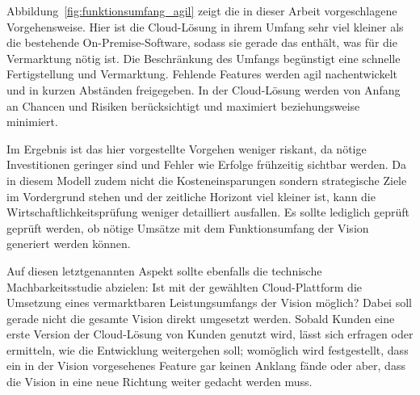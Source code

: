 
Abbildung~\ref{fig:funktionsumfang_agil} zeigt die in dieser Arbeit 
vorgeschlagene Vorgehensweise. Hier ist die Cloud-Lösung in ihrem Umfang sehr 
viel kleiner als die bestehende On-Premise-Software, sodass sie gerade das 
enthält, was für die Vermarktung nötig ist. Die Beschränkung des Umfangs 
begünstigt eine schnelle Fertigstellung und Vermarktung. Fehlende Features 
werden agil nachentwickelt und in kurzen Abständen freigegeben. In der 
Cloud-Lösung werden von Anfang an Chancen und Risiken berücksichtigt und 
maximiert beziehungsweise minimiert. 

Im Ergebnis ist das hier vorgestellte Vorgehen weniger riskant, da nötige 
Investitionen geringer sind und Fehler wie Erfolge frühzeitig sichtbar werden. 
Da in diesem Modell zudem nicht die Kosteneinsparungen sondern strategische 
Ziele im Vordergrund stehen und der zeitliche Horizont viel kleiner ist, kann 
die Wirtschaftlichkeitsprüfung weniger detailliert ausfallen. Es sollte 
lediglich geprüft geprüft werden, ob nötige Umsätze mit dem Funktionsumfang der 
Vision generiert werden können. 

Auf diesen letztgenannten Aspekt sollte ebenfalls die technische 
Machbarkeitsstudie abzielen: Ist mit der gewählten Cloud-Plattform die 
Umsetzung eines vermarktbaren Leistungsumfangs der Vision möglich? Dabei soll 
gerade nicht die gesamte Vision direkt umgesetzt werden. Sobald Kunden eine 
erste Version der Cloud-Lösung von Kunden genutzt wird, lässt sich erfragen 
oder ermitteln, wie die Entwicklung weitergehen soll; womöglich wird 
festgestellt, dass ein in der Vision vorgesehenes Feature gar keinen Anklang 
fände oder aber, dass die Vision in eine neue Richtung weiter gedacht werden 
muss.


\begin{comment}
\subsubsection{Technische Machbarkeit}


\subsubsection{Wirtschaftliche Machbarkeit}
"`In diesem Punkt unterscheidet sich Cloud-Computing von früheren Paradigmen
wie Outsourcing, welches nicht auf das Geschäftsmodell des Unternehmens wirken
will. Durch neue Anwendungsszenarien kann mit Cloud-Computing ein beachtlicher
Mehrwert geschaffen werden."' \pcite{}{154}{cloud_migration}

"`Alle Empfehlungen sollten mit einem Business Case hinterlegt werden, der
die Höhe der Kostenreduktion und die Verbesserung des Servicelevels zeigt."'
\pcite{}{158}{cloud_migration}
\end{comment}


